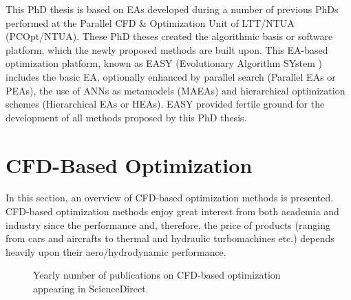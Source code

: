 This PhD thesis is based on EAs developed during a number of previous PhDs \cite{phd_Giotis,phd_Karakasis,phd_Kampolis,phd_Vera} performed at the Parallel CFD \& Optimization Unit of LTT/NTUA (PCOpt/NTUA). These PhD theses created the algorithmic basis or software platform,  which the newly proposed methods are built upon. This EA-based optimization platform, known as EASY (Evolutionary Algorithm SYstem \cite{EASYsite}) includes the basic EA, optionally enhanced by parallel search (Parallel EAs or PEAs), the use of ANNs as metamodels (MAEAs) and hierarchical optimization schemes (Hierarchical EAs or HEAs). EASY provided fertile ground for the development of all methods proposed by this PhD thesis.                       
 
 
\section{CFD-Based Optimization}

In this section, an overview of CFD-based optimization methods is presented. CFD-based optimization methods enjoy great interest from both academia and industry since the performance and, therefore, the price of products (ranging from cars and aircrafts to thermal and hydraulic turbomachines etc.) depends heavily upon their aero/hydrodynamic performance. 

\begin{figure}[h!]
\begin{minipage}[b]{1\linewidth}
 \centering
\end{minipage}
\caption{Yearly number of publications on CFD-based optimization appearing in ScienceDirect.} 
\label{pubs.CFD}
\end{figure}

